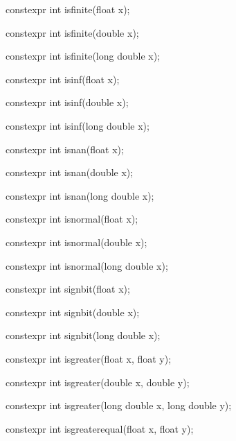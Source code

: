 \documentclass[prd,twocolumn,amsmath,amssymb,nofootinbib,eqsecnum]{revtex4-1}
\newcommand{\oldhighlight}[1]{{\color{blue} #1}}
\begin{document}
{\oldhighlight{constexpr} int isfinite(float x);

\oldhighlight{constexpr} int isfinite(double x);

\oldhighlight{constexpr} int isfinite(long double x);

\vspace{2ex}


\oldhighlight{constexpr} int isinf(float x);

\oldhighlight{constexpr} int isinf(double x);

\oldhighlight{constexpr} int isinf(long double x);

\vspace{2ex}


\oldhighlight{constexpr} int isnan(float x);

\oldhighlight{constexpr} int isnan(double x);

\oldhighlight{constexpr} int isnan(long double x);

\vspace{2ex}


\oldhighlight{constexpr} int isnormal(float x);

\oldhighlight{constexpr} int isnormal(double x);

\oldhighlight{constexpr} int isnormal(long double x);

\vspace{2ex}


\oldhighlight{constexpr} int signbit(float x);

\oldhighlight{constexpr} int signbit(double x);

\oldhighlight{constexpr} int signbit(long double x);

\vspace{2ex}


\oldhighlight{constexpr} int isgreater(float x, float y);

\oldhighlight{constexpr} int isgreater(double x, double y);

\oldhighlight{constexpr} int isgreater(long double x, long double y);

\vspace{2ex}


\oldhighlight{constexpr} int isgreaterequal(float x, float y);

}
\end{document}
